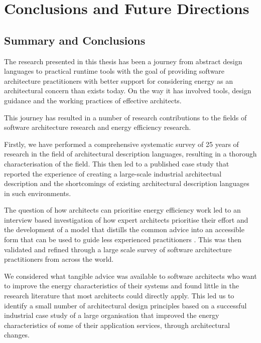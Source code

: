 \chapter{Conclusions and Future Directions}

\section{Summary and Conclusions}

The research presented in this thesis has been a journey from abstract design languages to practical runtime tools with the goal of providing software architecture practitioners with better support for considering energy as an architectural concern than exists today.  On the way it has involved tools, design guidance and the working practices of effective architects.

This journey has resulted in a number of research contributions to the fields of software architecture research and energy efficiency research.

Firstly, we have performed a comprehensive systematic survey of 25 years of research in the field of architectural description languages, resulting in a thorough characterisation of the field.  This then led to a published case study \cite{woods2012-adlcasestudy, woods2015-adlcasestudy} that reported the experience of creating a large-scale industrial architectual description and the shortcomings of existing architectural description languages in such environments.

The question of how architects can prioritise energy efficiency work led to an interview based investigation of how expert architects prioritise their effort and the development of a model that distills the common advice into an accessible form that can be used to guide less experienced practitioners \cite{woods2017-archeffort}.  This was then validated and refined through a large scale survey of software architecture practitioners from across the world.

We considered what tangible advice was available to software architects who want to improve the energy characteristics of their systems and found little in the research literature that most architects could directly apply.  This led us to identify a small number of architectural design principles \cite{bashroush2017-archprinciples} based on a successful industrial case study of a large organisation that improved the energy characteristics of some of their application services, through architectural changes.

